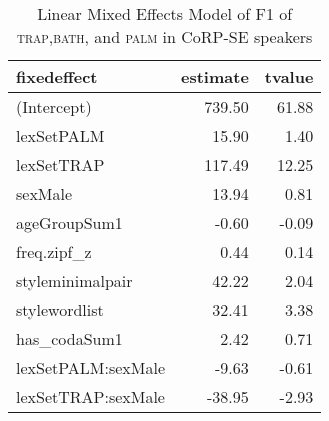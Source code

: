 \begin{table}[ht]
\centering
\begin{tabular}{lrr}
  \hline
fixedeffect & estimate & tvalue \\ 
  \hline
(Intercept) & 739.50 & 61.88 \\ 
  lexSetPALM & 15.90 & 1.40 \\ 
  lexSetTRAP & 117.49 & 12.25 \\ 
  sexMale & 13.94 & 0.81 \\ 
  ageGroupSum1 & -0.60 & -0.09 \\ 
  freq.zipf\_z & 0.44 & 0.14 \\ 
  styleminimalpair & 42.22 & 2.04 \\ 
  stylewordlist & 32.41 & 3.38 \\ 
  has\_codaSum1 & 2.42 & 0.71 \\ 
  lexSetPALM:sexMale & -9.63 & -0.61 \\ 
  lexSetTRAP:sexMale & -38.95 & -2.93 \\ 
   \hline
\end{tabular}
\caption{Linear Mixed Effects Model of F1 of \textsc{trap},\textsc{bath}, and \textsc{palm} in CoRP-SE speakers \label{tbl:TBPF1SE}} 
\end{table}
